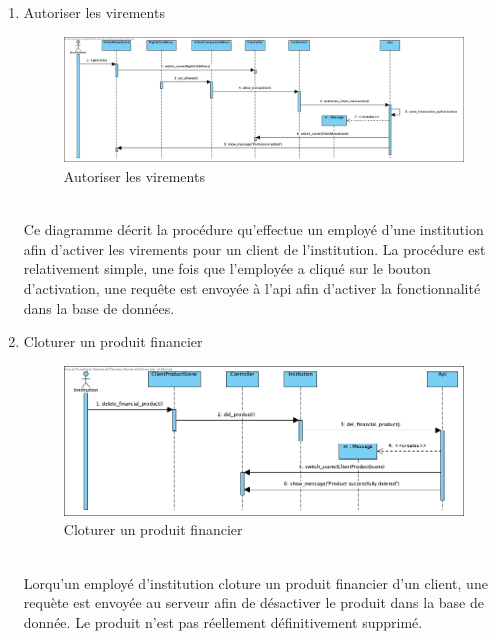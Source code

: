 \documentclass[../rapport.tex]{subfiles}
\begin{document}
\begin{enumerate}
	\item{Autoriser les virements}\\
		\begin{figure}[h]
			\centering\includegraphics[scale=0.25]{ressources/photos_diagrammes/app2/sequences2/autoriserVirement.jpg}
			\caption{Autoriser les virements}
		\end{figure}\\
Ce diagramme décrit la procédure qu'effectue un employé d'une institution afin d'activer les virements pour un client de l'institution.
La procédure est relativement simple, une fois que l'employée a cliqué sur le bouton d'activation, une requête est envoyée à l'api afin d'activer la fonctionnalité dans la base de données.

	\item{Cloturer un produit financier}\\
		\begin{figure}[h]
			\centering\includegraphics[scale=0.25]{ressources/photos_diagrammes/app2/sequences2/cloturerProduitFinancier.jpg}
			\caption{Cloturer un produit financier}
		\end{figure}\\
Lorqu'un employé d'institution cloture un produit financier d'un client, une requète est envoyée au serveur afin de désactiver le produit dans la base de donnée. Le produit n'est pas réellement définitivement supprimé.


\end{enumerate}
\end{document}
